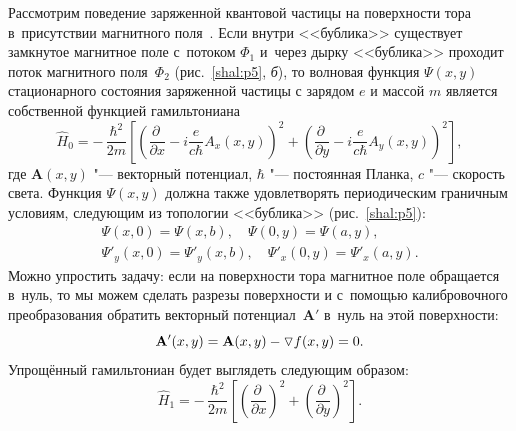 Рассмотрим поведение заряженной квантовой частицы на поверхности тора
в~присутствии магнитного поля~\cite{matphys4}.
Если внутри <<бублика>> существует замкнутое магнитное поле с~потоком $\Phi_1$ и~через дырку <<бублика>> проходит поток магнитного поля~$\Phi_2$ (рис.~\ref{shal:p5}, {\sl б}), то волновая функция $\Psi(x, y)$ стационарного состояния заряженной частицы с зарядом $e$ и массой $m$ является собственной функцией
гамильтониана
$$\hat H_0=- \,\frac{\hbar^2}{2m}
\left[
 \left(\frac{\partial~}{\partial x}-i\frac{e}{c\hbar}A_x(x,y)\right)^2
+\left(\frac{\partial~}{\partial y}-i\frac{e}{c\hbar}A_y(x,y)\right)^2
\right],$$
где $\mathbf{A}(x,y)$ "--- векторный потенциал, $\hbar$ "--- постоянная Планка,
$c$ "--- скорость света. 
Функция $\Psi(x,y)$ должна также удовлетворять периодическим граничным условиям, следующим из топологии <<бублика>> (рис.~\ref{shal:p5}):
\begin{gather}\label{bc old 1 rus}
  \Psi(x,0)=\Psi(x,b),\quad 
  \Psi(0,y)=\Psi(a,y),
\\
\label{bc old 2 rus}
  \Psi'_y(x,0)=\Psi'_y(x,b),\quad
  \Psi'_x(0,y)=\Psi'_x(a,y).
\end{gather}
Можно упростить задачу: если на поверхности тора магнитное поле
обращается в~нуль, то мы можем сделать разрезы поверхности и с~помощью
калибровочного преобразования обратить векторный потенциал~$\mathbf{A'}$ в~нуль на этой
поверхности:
\begin{equation}\label{A rus}
 {\bf A'}(x,y)= {\bf A}(x,y) - \triangledown f(x,y)=0.
\end{equation}
Упрощённый гамильтониан будет выглядеть следующим образом:
$$
 \hat H_1=-\,\frac{\hbar^2}{2m}
\left[
  \left(\frac{\partial~}{\partial x}\right)^2
+\left(\frac{\partial~}{\partial y}\right)^2 \right].$$

